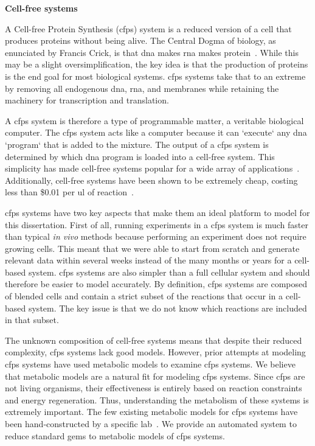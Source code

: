 \textbf{Cell-free systems}

A Cell-free Protein Synthesis (\gls{cfps}) system is a reduced version of a cell that produces proteins without being alive.
The Central Dogma of biology, as enunciated by Francis Crick, is that \gls{dna} makes \gls{rna} makes protein~\cite{crick1970central}.
While this may be a slight oversimplification, the key idea is that the production of proteins is the end goal for most biological systems.
\gls{cfps} systems take that to an extreme by removing all endogenous \gls{dna}, \gls{rna}, and membranes while retaining the machinery for transcription and translation.

A \gls{cfps} system is therefore a type of programmable matter, a veritable biological computer.
The \gls{cfps} system acts like a computer because it can `execute` any \gls{dna} `program` that is added to the mixture.
The output of a \gls{cfps} system is determined by which \gls{dna} program is loaded into a cell-free system.
This simplicity has made cell-free systems popular for a wide array of applications~\cite{hodgman2012cell, rollin2013new, carlson2012cell}.
Additionally, cell-free systems have been shown to be extremely cheap, costing less than \$0.01 per \gls{ul} of reaction~\cite{sun2013protocols, murray2013cost}.

\gls{cfps} systems have two key aspects that make them an ideal platform to model for this dissertation.
First of all, running experiments in a \gls{cfps} system is much faster than typical \textit{in vivo} methods because performing an experiment does not require growing cells.
This meant that we were able to start from scratch and generate relevant data within several weeks instead of the many months or years for a cell-based system.
\gls{cfps} systems are also simpler than a full cellular system and should therefore be easier to model accurately.
By definition, \gls{cfps} systems are composed of blended cells and contain a strict subset of the reactions that occur in a cell-based system.
The key issue is that we do not know which reactions are included in that subset.

The unknown composition of cell-free systems means that despite their reduced complexity, \gls{cfps} systems lack good models.
However, prior attempts at modeling \gls{cfps} systems have used metabolic models to examine \gls{cfps} systems.
We believe that metabolic models are a natural fit for modeling \gls{cfps} systems.
Since \gls{cfps} are not living organisms, their effectiveness is entirely based on reaction constraints and energy regeneration.
Thus, understanding the metabolism of these systems is extremely important.
The few existing metabolic models for \gls{cfps} systems have been hand-constructed by a specific lab~\cite{bujara2012silico, vilkhovoy2017sequence}.
We provide an automated system to reduce standard \glspl{gem} to metabolic models of \gls{cfps} systems.

